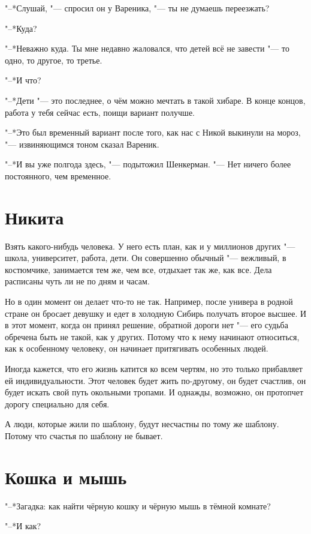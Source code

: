 "--*Слушай, "--- спросил он у Вареника, "--- ты не думаешь переезжать?

"--*Куда?

"--*Неважно куда.
Ты мне недавно жаловался, что детей всё не завести "--- то одно, то другое, то третье.

"--*И что?

"--*Дети "--- это последнее, о чём можно мечтать в такой хибаре.
В конце концов, работа у тебя сейчас есть, поищи вариант получше.

"--*Это был временный вариант после того, как нас с Никой выкинули на мороз, "--- извиняющимся тоном сказал Вареник.

"--*И вы уже полгода здесь, "--- подытожил Шенкерман.
"--- Нет ничего более постоянного, чем временное.

\section{Никита}

Взять какого-нибудь человека.
У него есть план, как и у миллионов других "--- школа, университет, работа, дети.
Он совершенно обычный "--- вежливый, в костюмчике, занимается тем же, чем все, отдыхает так же, как все.
Дела расписаны чуть ли не по дням и часам.

Но в один момент он делает что-то не так.
Например, после универа в родной стране он бросает девушку и едет в холодную Сибирь получать второе высшее.
И в этот момент, когда он принял решение, обратной дороги нет "--- его судьба обречена быть не такой, как у других.
Потому что к нему начинают относиться, как к особенному человеку, он начинает притягивать особенных людей.

Иногда кажется, что его жизнь катится ко всем чертям, но это только прибавляет ей индивидуальности.
Этот человек будет жить по-другому, он будет счастлив, он будет искать свой путь окольными тропами.
И однажды, возможно, он протопчет дорогу специально для себя.

А люди, которые жили по шаблону, будут несчастны по тому же шаблону.
Потому что счастья по шаблону не бывает.

\section{Кошка и мышь}

"--*Загадка: как найти чёрную кошку и чёрную мышь в тёмной комнате?

"--*И как?

